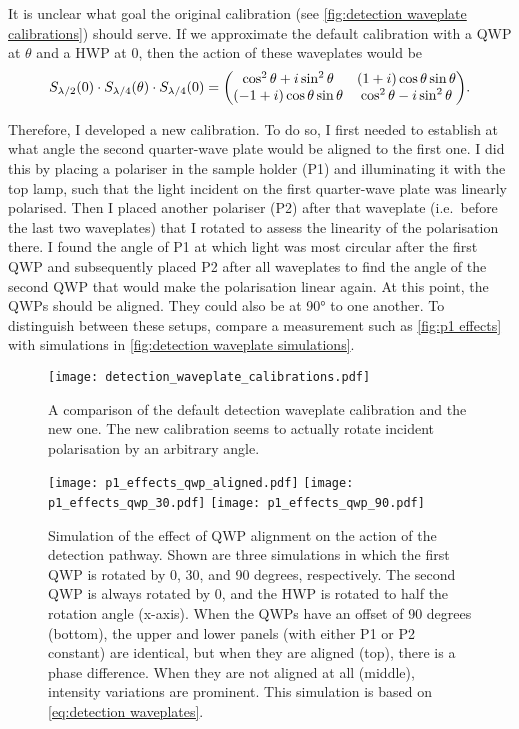 It is unclear what goal the original calibration (see \autoref{fig:detection waveplate calibrations}) should serve. If we approximate the default calibration with a QWP at $ \theta $ and a HWP at 0, then the action of these waveplates would be
\begin{equation}
	S_\hwp(0)\cdot S_\qwp(\theta)\cdot S_\qwp(0) = 
		\mqty( \cos^2\theta + i\sin^2\theta & (1+i)\cos\theta\sin\theta \\
			   (-1+i)\cos\theta\sin\theta   & \cos^2\theta - i\sin^2\theta 
	    ).
\end{equation}

Therefore, I developed a new calibration. To do so, I first needed to establish at what angle the second quarter-wave plate would be aligned to the first one. I did this by placing a polariser in the sample holder (P1) and illuminating it with the top lamp, such that the light incident on the first quarter-wave plate was linearly polarised. Then I placed another polariser (P2) after that waveplate (i.e.~before the last two waveplates) that I rotated to assess the linearity of the polarisation there. I found the angle of P1 at which light was most circular after the first QWP and subsequently placed P2 after all waveplates to find the angle of the second QWP that would make the polarisation linear again. At this point, the QWPs should be aligned. They could also be at \ang{90} to one another. To distinguish between these setups, compare a measurement such as \autoref{fig:p1 effects} with simulations in \autoref{fig:detection waveplate simulations}.

\begin{figure}
	\centering
	\texttt{[image: detection\_waveplate\_calibrations.pdf]}
	\caption{
		A comparison of the default detection waveplate calibration and the new one. The new calibration seems to actually rotate incident polarisation by an arbitrary angle.
	}
	\label{fig:detection waveplate calibrations}
\end{figure}


\begin{figure}
	\centering
	\texttt{[image: p1\_effects\_qwp\_aligned.pdf]}
	\texttt{[image: p1\_effects\_qwp\_30.pdf]}
	\texttt{[image: p1\_effects\_qwp\_90.pdf]}
	\caption{
		Simulation of the effect of QWP alignment on the action of the detection pathway. Shown are three simulations in which the first QWP is rotated by 0, 30, and 90 degrees, respectively. The second QWP is always rotated by 0, and the HWP is rotated to half the rotation angle (x-axis). When the QWPs have an offset of 90 degrees (bottom), the upper and lower panels (with either P1 or P2 constant) are identical, but when they are aligned (top), there is a phase difference. When they are not aligned at all (middle), intensity variations are prominent. This simulation is based on \autoref{eq:detection waveplates}.
	}
	\label{fig:detection waveplate simulations}
\end{figure}


